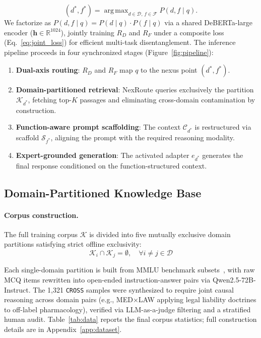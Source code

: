 \documentclass[a4paper,fleql]{cas-sc}
\DeclareMathOperator*{\argmax}{arg\,max}
\begin{document}
\begin{equation}
    (d^*, f^*) = \argmax_{d \in \mathcal{D},\, f \in \mathcal{F}} P(d, f \mid q).
    \label{eq:nexus_joint}
\end{equation}
We factorize as $P(d, f \mid q) = P(d \mid q) \cdot P(f \mid q)$ via a shared DeBERTa-large encoder ($\mathbf{h} \in \mathbb{R}^{1024}$), jointly training $R_D$ and $R_F$ under a composite loss (Eq.~\ref{eq:joint_loss}) for efficient multi-task disentanglement.
The inference pipeline proceeds in four synchronized stages
(Figure~\ref{fig:pipeline}):
\begin{enumerate}
    \item \textbf{Dual-axis routing}: $R_D$ and $R_F$ map $q$ to the nexus
    point $(d^*, f^*)$.
    \item \textbf{Domain-partitioned retrieval}: NexRoute queries exclusively
    the partition $\mathcal{K}_{d^*}$, fetching top-$K$ passages and
    eliminating cross-domain contamination by construction.
    \item \textbf{Function-aware prompt scaffolding}: The context
    $\mathcal{C}_{d^*}$ is restructured via scaffold $\mathcal{S}_{f^*}$,
    aligning the prompt with the required reasoning modality.
    \item \textbf{Expert-grounded generation}: The activated adapter $e_{d^*}$
    generates the final response conditioned on the function-structured context.
\end{enumerate}
\subsection{Domain-Partitioned Knowledge Base}
\label{ssec:retrieval}
\paragraph{Corpus construction.}
The full training corpus $\mathcal{K}$ is divided into five mutually exclusive
domain partitions satisfying strict offline exclusivity:
\begin{equation}
    \mathcal{K}_i \cap \mathcal{K}_j = \emptyset,
    \quad \forall i \neq j \in \mathcal{D}
    \label{eq:partition}
\end{equation}

Each single-domain partition is built from MMLU benchmark
subsets~\citep{hendrycks2021mmlu}, with raw MCQ items rewritten into
open-ended instruction-answer pairs via Qwen2.5-72B-Instruct.
The 1,321 \texttt{CROSS} samples were synthesized to require joint causal
reasoning across domain pairs (e.g., MED$\times$LAW applying legal liability
doctrines to off-label pharmacology), verified via LLM-as-a-judge filtering
and a stratified human audit. Table~\ref{tab:data} reports the final corpus
statistics; full construction details are in Appendix~\ref{app:dataset}.
\end{document}
